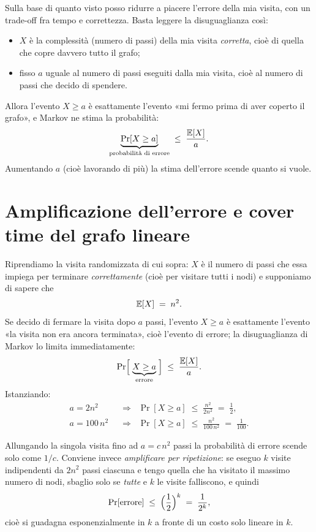 Sulla base di quanto visto posso ridurre a piacere l'errore della mia visita, con un
trade-off fra tempo e correttezza. Basta leggere la disuguaglianza così:
\begin{itemize}
  \item $X$ è la complessità (numero di passi) della mia visita \emph{corretta}, cioè di
        quella che copre davvero tutto il grafo;
  \item fisso $a$ uguale al numero di passi eseguiti dalla mia visita, cioè al numero di
        passi che decido di spendere.
\end{itemize}
Allora l'evento $X \ge a$ è esattamente l'evento «mi fermo prima di aver coperto il grafo», e
Markov ne stima la probabilità:
\[
  \underbrace{\Pr[X \ge a]}_{\text{probabilità di errore}} \;\le\; \frac{\E[X]}{a}.
\]
Aumentando $a$ (cioè lavorando di più) la stima dell'errore scende quanto si vuole.

\section{Amplificazione dell'errore e cover time del grafo lineare}
\label{sec:cover-lineare}

\begin{esempio}
Riprendiamo la visita randomizzata di cui sopra: $X$ è il numero di passi che essa impiega per
terminare \emph{correttamente} (cioè per visitare tutti i nodi) e supponiamo di sapere che
\[
  \E[X] \;=\; n^2 .
\]
Se decido di fermare la visita dopo $a$ passi, l'evento $X \ge a$ è esattamente l'evento «la
visita non era ancora terminata», cioè l'evento di errore; la disuguaglianza di Markov lo
limita immediatamente:
\[
  \Pr\Bigl[\;\underbrace{X \ge a}_{\text{errore}}\;\Bigr] \;\le\; \frac{\E[X]}{a}.
\]
Istanziando:
\begin{align*}
  a = 2n^2    &\;\;\Longrightarrow\;\; \Pr[X \ge a] \;\le\; \frac{n^2}{2n^2}   \;=\; \frac{1}{2},\\[2pt]
  a = 100\,n^2 &\;\;\Longrightarrow\;\; \Pr[X \ge a] \;\le\; \frac{n^2}{100\,n^2} \;=\; \frac{1}{100}.
\end{align*}
\end{esempio}

Allungando la singola visita fino ad $a = c\,n^2$ passi la probabilità di errore scende solo
come $1/c$. Conviene invece \emph{amplificare per ripetizione}: se eseguo $k$ visite
indipendenti da $2n^2$ passi ciascuna e tengo quella che ha visitato il massimo numero di
nodi, sbaglio solo se \emph{tutte} e $k$ le visite falliscono, e quindi
\[
  \Pr[\text{errore}] \;\le\; \Bigl(\frac{1}{2}\Bigr)^{k} \;=\; \frac{1}{2^{k}},
\]
cioè si guadagna esponenzialmente in $k$ a fronte di un costo solo lineare in $k$.

